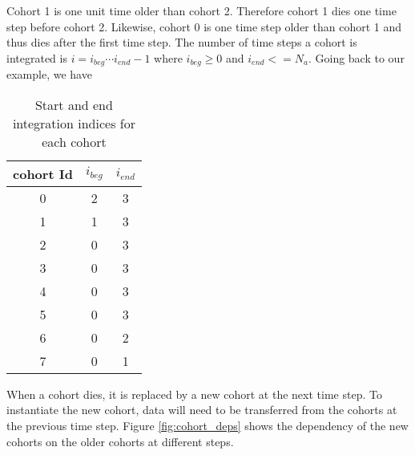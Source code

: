 \documentclass[a4paper,oneside,12pt]{article}
\begin{document}
Cohort 1 is one unit time older than cohort 2. Therefore cohort 1 dies one time step before cohort 2. Likewise,
cohort 0 is one time step older than cohort 1 and thus dies after the first time step. The number of time steps 
a cohort is integrated is $i = i_{beg} \cdots i_{end} - 1$ where $i_{beg} \geq 0$  and $i_{end} <= N_a$. Going back 
to our example, we have
\begin{table}[htbp]
    \centering %
    \caption{Start and end integration indices for each cohort}
    \label{tab:cohort_indices}
    \begin{tabular}{c|cc} %
        \toprule %
        cohort Id & $i_{beg}$ & $i_{end}$ \\
        \midrule %
        0 & 2 & 3 \\
        1 & 1 & 3 \\
        2 & 0 & 3 \\
        3 & 0 & 3 \\
        4 & 0 & 3 \\
        5 & 0 & 3 \\
        6 & 0 & 2 \\
        7 & 0 & 1 \\
        \bottomrule %
    \end{tabular}
\end{table}
When a cohort dies, it is replaced by a new cohort at the next time step. To instantiate the new cohort, data will need 
to be transferred from the cohorts at the previous time step. Figure \ref{fig:cohort_deps} shows the dependency of the new cohorts on the older 
cohorts at different steps.
\end{document}
